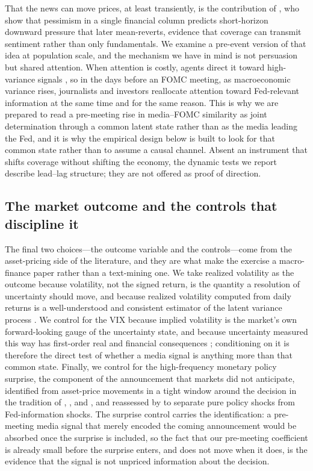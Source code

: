 \documentclass[11pt,a4paper]{article}
\begin{document}
That the news can move prices, at least transiently, is the contribution of
\citet{tetlock2007giving}, who show that pessimism in a single financial column
predicts short-horizon downward pressure that later mean-reverts, evidence that
coverage can transmit sentiment rather than only fundamentals. We examine a
pre-event version of that idea at population scale, and the mechanism we have in
mind is not persuasion but shared attention. When attention is costly, agents
direct it toward high-variance signals \citep{sims2003implications,mackowiak2009optimal},
so in the days before an FOMC meeting, as macroeconomic variance rises, journalists
and investors reallocate attention toward Fed-relevant information at the same time
and for the same reason. This is why we are prepared to read a pre-meeting rise in
media--FOMC similarity as joint determination through a common latent state rather
than as the media leading the Fed, and it is why the empirical design below is
built to look for that common state rather than to assume a causal channel. Absent
an instrument that shifts coverage without shifting the economy, the dynamic tests
we report describe lead--lag structure; they are not offered as proof of direction.

\subsection{The market outcome and the controls that discipline it}

The final two choices---the outcome variable and the controls---come from the
asset-pricing side of the literature, and they are what make the exercise a
macro-finance paper rather than a text-mining one. We take realized volatility as
the outcome because volatility, not the signed return, is the quantity a resolution
of uncertainty should move, and because realized volatility computed from daily
returns is a well-understood and consistent estimator of the latent variance
process \citep{andersen2003modeling}. We control for the VIX because implied
volatility is the market's own forward-looking gauge of the uncertainty state, and
because uncertainty measured this way has first-order real and financial
consequences \citep{bloom2009impact}; conditioning on it is therefore the direct
test of whether a media signal is anything more than that common state. Finally, we
control for the high-frequency monetary policy surprise, the component of the
announcement that markets did not anticipate, identified from asset-price movements
in a tight window around the decision in the tradition of \citet{kuttner2001monetary},
\citet{gurkaynak2005sensitivity}, and \citet{nakamura2018high}, and reassessed by
\citet{bauer2023reassessment} to separate pure policy shocks from Fed-information
shocks. The surprise control carries the identification: a pre-meeting media signal
that merely encoded the coming announcement would be absorbed once the surprise is
included, so the fact that our pre-meeting coefficient is already small before the
surprise enters, and does not move when it does, is the evidence that the signal is
not unpriced information about the decision.
\end{document}
